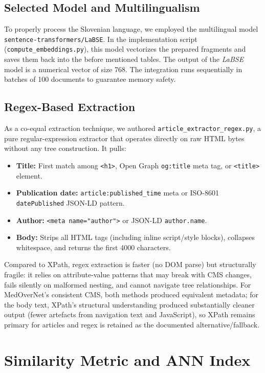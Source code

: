 \documentclass[9pt]{IEEEtran}
\begin{document}
\subsection{Selected Model and Multilingualism}
To properly process the Slovenian language, we employed the multilingual model \texttt{sentence-transformers/LaBSE}.
In the implementation script (\texttt{compute\_embeddings.py}), this model vectorizes the prepared fragments and saves
them back into the before mentioned tables. The output of the \textit{LaBSE} model is a numerical vector of size 768.
The integration runs sequentially in batches of 100 documents to guarantee memory safety.

\subsection{Regex-Based Extraction}
As a co-equal extraction technique, we authored \texttt{article\_extractor\_regex.py}, a pure regular-expression extractor that operates directly on raw HTML bytes without any tree construction. It pulls:
\begin{itemize}
    \item \textbf{Title:} First match among \texttt{<h1>}, Open Graph \texttt{og:title} meta tag, or \texttt{<title>} element.
    \item \textbf{Publication date:} \texttt{article:published\_time} meta or ISO-8601 \texttt{datePublished} JSON-LD pattern.
    \item \textbf{Author:} \texttt{<meta name="author">} or JSON-LD \texttt{author.name}.
    \item \textbf{Body:} Strips all HTML tags (including inline script/style blocks), collapses whitespace, and returns the first 4000 characters.
\end{itemize}
Compared to XPath, regex extraction is faster (no DOM parse) but structurally fragile: it relies on attribute-value patterns that may break with CMS changes,
fails silently on malformed nesting, and cannot navigate tree relationships. For MedOverNet's consistent CMS, both methods produced equivalent metadata;
for the body text, XPath's structural understanding produced substantially cleaner output (fewer artefacts from navigation text and JavaScript),
so XPath remains primary for articles and regex is retained as the documented alternative/fallback.

\section{Similarity Metric and ANN Index}
\end{document}
